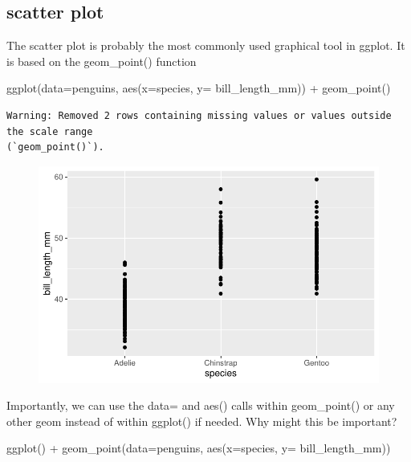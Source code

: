 \documentclass[
  letterpaper,
  DIV=11,
  numbers=noendperiod]{scrartcl}
\newenvironment{Shaded}{\begin{snugshade}}{\end{snugshade}}
\newcommand{\AttributeTok}[1]{\textcolor[rgb]{0.40,0.45,0.13}{#1}}
\newcommand{\FunctionTok}[1]{\textcolor[rgb]{0.28,0.35,0.67}{#1}}
\newcommand{\NormalTok}[1]{\textcolor[rgb]{0.00,0.23,0.31}{#1}}
\newcommand{\SpecialCharTok}[1]{\textcolor[rgb]{0.37,0.37,0.37}{#1}}
\begin{document}
\subsection{\texorpdfstring{\textbf{scatter plot}}{scatter plot}}

The scatter plot is probably the most commonly used graphical tool in
ggplot. It is based on the geom\_point() function

\begin{Shaded}
\begin{Highlighting}[]
\FunctionTok{ggplot}\NormalTok{(}\AttributeTok{data=}\NormalTok{penguins, }\FunctionTok{aes}\NormalTok{(}\AttributeTok{x=}\NormalTok{species, }\AttributeTok{y=}\NormalTok{ bill\_length\_mm)) }\SpecialCharTok{+}
  \FunctionTok{geom\_point}\NormalTok{()}
\end{Highlighting}
\end{Shaded}

\begin{verbatim}
Warning: Removed 2 rows containing missing values or values outside the scale range
(`geom_point()`).
\end{verbatim}

\begin{figure}[H]

{\centering \includegraphics{Lab_2_files/figure-pdf/unnamed-chunk-15-1.pdf}

}

\end{figure}

Importantly, we can use the data= and aes() calls within geom\_point()
or any other geom instead of within ggplot() if needed. Why might this
be important?

\begin{Shaded}
\begin{Highlighting}[]
\FunctionTok{ggplot}\NormalTok{() }\SpecialCharTok{+}
  \FunctionTok{geom\_point}\NormalTok{(}\AttributeTok{data=}\NormalTok{penguins, }\FunctionTok{aes}\NormalTok{(}\AttributeTok{x=}\NormalTok{species, }\AttributeTok{y=}\NormalTok{ bill\_length\_mm))}
\end{Highlighting}
\end{Shaded}
\end{document}
